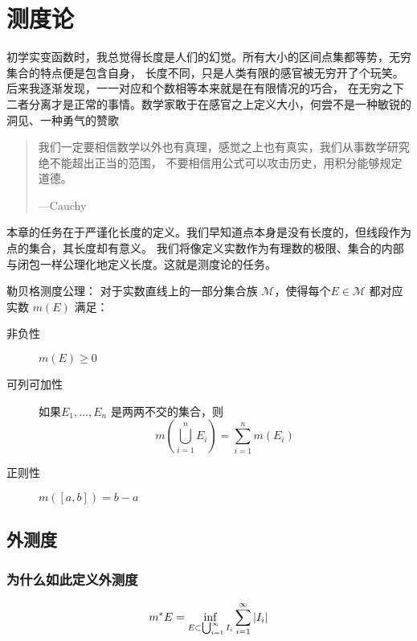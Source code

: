 \chapter{测度论}

初学实变函数时，我总觉得长度是人们的幻觉。所有大小的区间点集都等势，无穷集合的特点便是包含自身，
长度不同，只是人类有限的感官被无穷开了个玩笑。后来我逐渐发现，一一对应和个数相等本来就是在有限情况的巧合，
在无穷之下二者分离才是正常的事情。数学家敢于在感官之上定义大小，何尝不是一种敏锐的洞见、一种勇气的赞歌

\begin{quote}
    我们一定要相信数学以外也有真理，感觉之上也有真实，我们从事数学研究绝不能超出正当的范围，
    不要相信用公式可以攻击历史，用积分能够规定道德。

    \hfill ---Cauchy
\end{quote}

本章的任务在于严谨化长度的定义。我们早知道点本身是没有长度的，但线段作为点的集合，其长度却有意义。
我们将像定义实数作为有理数的极限、集合的内部与闭包一样公理化地定义长度。这就是测度论的任务。

\begin{definition}
    勒贝格测度公理： 对于实数直线上的一部分集合族 \(\mathscr{M}\)，使得每个\(E \in
    \mathscr{M}\) 都对应实数 \(m(E)\) 满足：
    \begin{description}
        \item[非负性] \(m(E) \geq 0\)
        \item[可列可加性] 如果\(E_1, \dots ,E_{n}\) 是两两不交的集合，则
            \[
                m\left(\bigcup_{i=1}^{n} E_i\right) =
                \sum_{i=1}^{n} m(E_i)
            \]
        \item[正则性] \(m([a,b])=b-a\)
    \end{description}
\end{definition}

\section{外测度}
\subsection{为什么如此定义外测度}

\begin{definition}
    \[
        m^{*} E=\inf_{E\subset \bigcup_{i=1}^{\infty} I_{i}}
        \sum_{i=1}^{\infty} \left|I_{i}\right|
    \]
\end{definition}

